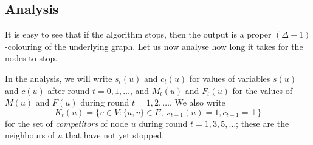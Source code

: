 \subsection{Analysis}

It is easy to see that if the algorithm stops, then the output is a proper ${(\Delta+1)}$-colouring of the underlying graph. Let us now analyse how long it takes for the nodes to stop.

In the analysis, we will write $s_t(u)$ and $c_t(u)$ for values of variables $s(u)$ and $c(u)$ after round $t = 0,1,\dotsc$, and $M_t(u)$ and $F_t(u)$ for the values of $M(u)$ and $F(u)$ during round $t=1,2,\dotsc$. We also write
\[
    K_t(u) = \bigl\{ v \in V : \{u,v\} \in E,\ s_{t-1}(u) = 1, c_{t-1} = \bot \bigr\}
\]
for the set of \emph{competitors} of node $u$ during round $t = 1,3,5,\dotsc$; these are the neighbours of $u$ that have not yet stopped.

